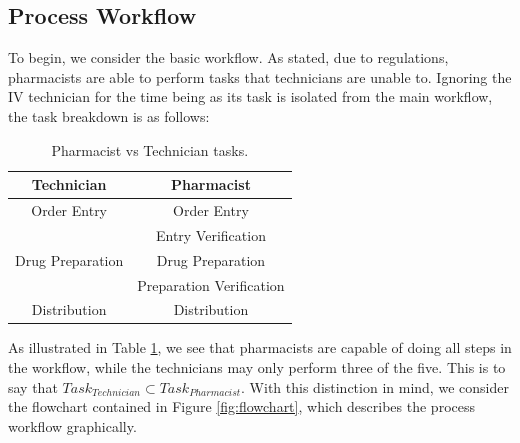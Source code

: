 \documentclass[10pt]{report}            %
\begin{document}
\subsection*{Process Workflow}
To begin, we consider the basic workflow. As stated, due to regulations, pharmacists are able to perform tasks that technicians are unable to. Ignoring the IV technician for the time being as its task is isolated from the main workflow, the task breakdown is as follows:
\begin{table}[H]
\centering
\begin{tabular}{|c||c|}
\hline
Technician & Pharmacist\\\hline\hline
Order Entry & Order Entry \\\hline
& \cellcolor{red!25}Entry Verification \\\hline
Drug Preparation & Drug Preparation\\\hline
& \cellcolor{red!25}Preparation Verification\\\hline
Distribution & Distribution\\\hline
\end{tabular}
\caption{Pharmacist vs Technician tasks.}
\label{table:tasks}
\end{table}
As illustrated in Table \ref{table:tasks}, we see that pharmacists are capable of doing all steps in the workflow, while the technicians may only perform three of the five. This is to say that $Task_{Technician}\subset Task_{Pharmacist}$.  With this distinction in mind, we consider the flowchart contained in Figure \ref{fig:flowchart}, which describes the process workflow graphically.
\end{document}
